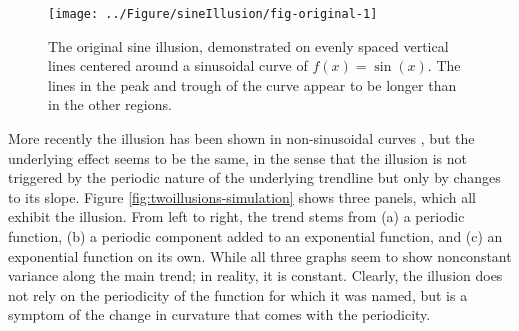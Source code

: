 \documentclass[11pt]{isuthesis}\usepackage[]{graphicx}\usepackage[]{color}
\newenvironment{knitrout}{}{} %
\begin{document}
\begin{figure}[hbtp]
\centering
\begin{knitrout}
\color{fgcolor}

{\centering \texttt{[image: ../Figure/sineIllusion/fig-original-1]} 

}



\end{knitrout}
\caption[The original sine illusion]{The original sine illusion, demonstrated on evenly spaced vertical lines centered around a sinusoidal curve of $f(x) = \sin(x)$. The lines in the peak and trough of the curve appear to be longer than in the other regions.\label{fig:original}}
\end{figure}

More recently the illusion has been shown in non-sinusoidal curves \citep{cleveland:1984, schonlau:2003, robbins:2005, parallelsets}, but the underlying effect seems to be the same, in the sense that the illusion is not triggered by the periodic nature of the underlying trendline but only by  changes to its slope. Figure \ref{fig:twoillusions-simulation} shows three panels, which all exhibit the illusion. From left to right, the trend stems from (a) a periodic function, (b) a periodic component added to an exponential function, and (c) an exponential function on its own.
While all three graphs seem to show nonconstant variance along the main trend; in reality, it is constant. Clearly, the illusion does not rely on the periodicity of the function for which it was named, but is a symptom of the change in curvature that comes with the periodicity.
\end{document}
